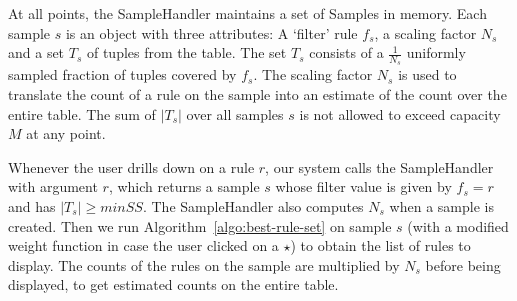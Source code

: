 At all points, the SampleHandler maintains a set of Samples in memory. Each sample $s$ is an object with three attributes: A `filter' rule $f_s$, a scaling factor $N_s$ and a set $T_s$ of tuples from the table. The set $T_s$ consists of a $\frac{1}{N_s}$ uniformly sampled fraction of tuples covered by $f_s$. The scaling factor $N_s$ is used to translate the count of a rule on the sample into an estimate of the count over the entire table. The sum of $|T_s|$ over all samples $s$ is not allowed to exceed capacity $M$ at any point. 

Whenever the user drills down on a rule $r$, our system calls the SampleHandler with argument $r$, which returns a sample $s$ whose filter value is given by $f_s = r$ and has $|T_s| \geq minSS$. The SampleHandler also computes $N_s$ when a sample is created. Then we run Algorithm~\ref{algo:best-rule-set} on sample $s$ (with a modified weight function in case the user clicked on a $\star$) to obtain the list of rules to display. The counts of the rules on the sample are multiplied by $N_s$ before being displayed, to get estimated counts on the entire table. 


